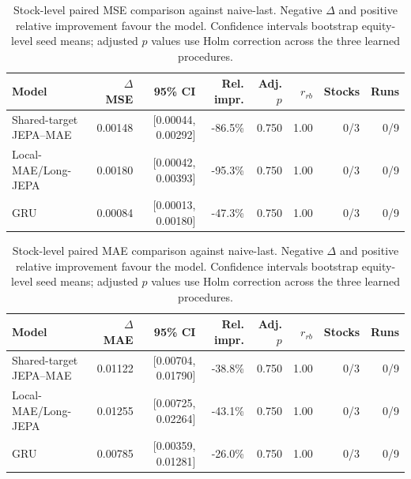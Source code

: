 \begin{table}[t]
\centering
\small
\caption{Stock-level paired MSE comparison against naive-last. Negative $\Delta$ and positive relative improvement favour the model. Confidence intervals bootstrap equity-level seed means; adjusted $p$ values use Holm correction across the three learned procedures.}
\label{tab:paired_mse_naive}
\begin{tabular}{lrrrrrrr}
\toprule
Model & $\Delta$MSE & 95\% CI & Rel. impr. & Adj. $p$ & $r_{rb}$ & Stocks & Runs \\
\midrule
Shared-target JEPA--MAE & 0.00148 & [0.00044, 0.00292] & -86.5\% & 0.750 & 1.00 & 0/3 & 0/9 \\
Local-MAE/Long-JEPA & 0.00180 & [0.00042, 0.00393] & -95.3\% & 0.750 & 1.00 & 0/3 & 0/9 \\
GRU & 0.00084 & [0.00013, 0.00180] & -47.3\% & 0.750 & 1.00 & 0/3 & 0/9 \\
\bottomrule
\end{tabular}
\end{table}

\begin{table}[t]
\centering
\small
\caption{Stock-level paired MAE comparison against naive-last. Negative $\Delta$ and positive relative improvement favour the model. Confidence intervals bootstrap equity-level seed means; adjusted $p$ values use Holm correction across the three learned procedures.}
\label{tab:paired_mae_naive}
\begin{tabular}{lrrrrrrr}
\toprule
Model & $\Delta$MAE & 95\% CI & Rel. impr. & Adj. $p$ & $r_{rb}$ & Stocks & Runs \\
\midrule
Shared-target JEPA--MAE & 0.01122 & [0.00704, 0.01790] & -38.8\% & 0.750 & 1.00 & 0/3 & 0/9 \\
Local-MAE/Long-JEPA & 0.01255 & [0.00725, 0.02264] & -43.1\% & 0.750 & 1.00 & 0/3 & 0/9 \\
GRU & 0.00785 & [0.00359, 0.01281] & -26.0\% & 0.750 & 1.00 & 0/3 & 0/9 \\
\bottomrule
\end{tabular}
\end{table}
